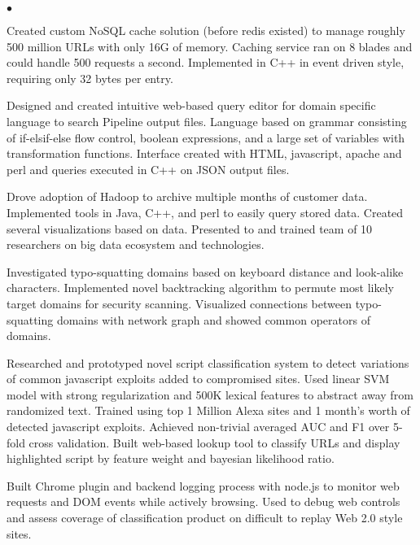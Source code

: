 \documentclass[margin,line]{res}
\newenvironment{list2}{
  \begin{list}{$\bullet$}{%
      \setlength{\itemsep}{0in}
      \setlength{\parsep}{0in} \setlength{\parskip}{0in}
      \setlength{\topsep}{0in} \setlength{\partopsep}{0in} 
      \setlength{\leftmargin}{0.2in}}}{\end{list}}
\begin{document}
\begin{resume}
\begin{list2}
\item Created custom NoSQL cache solution (before redis existed) to manage roughly 500 million URLs with only 16G of memory.  Caching service ran on 8 blades and could handle 500 requests a second.  Implemented in C++ in event driven style, requiring only 32 bytes per entry.

\item Designed and created intuitive web-based query editor for domain specific language to search Pipeline output files.  Language based on grammar consisting of if-elsif-else flow control, boolean expressions, and a large set of variables with transformation functions.  Interface created with  HTML, javascript, apache and perl and queries executed in C++ on JSON output files.

\item Drove adoption of Hadoop to archive multiple months of customer data.  Implemented tools in Java, C++, and perl to easily query stored data.  Created several visualizations based on data. Presented to and trained team of 10 researchers on big data ecosystem and technologies.

\item Investigated typo-squatting domains based on keyboard distance and look-alike characters.  Implemented novel backtracking algorithm to permute most likely target domains for security scanning.  Visualized connections between typo-squatting domains with network graph and showed common operators of domains.

\item Researched and prototyped novel script classification system to detect variations of common javascript exploits added to compromised sites.  Used linear SVM model with strong regularization and 500K lexical features to abstract away from randomized text.  Trained using top 1 Million Alexa sites and 1 month's worth of detected javascript exploits.  Achieved non-trivial averaged AUC and F1 over 5-fold cross validation.  Built web-based lookup tool to classify URLs and display highlighted script by feature weight and bayesian likelihood ratio.   

\item Built Chrome plugin and backend logging process with node.js to monitor web requests and DOM events while actively browsing.  Used to debug web controls and assess coverage of classification product on difficult to replay Web 2.0 style sites.

\end{list2}


\end{resume}
\end{document}
